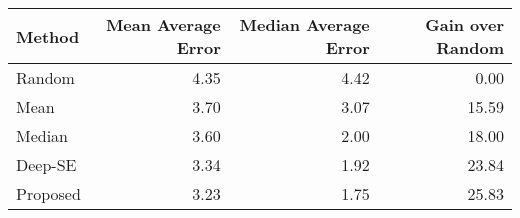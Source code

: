 \begin{tabular}{lrrr}
\toprule
   Method &  Mean Average Error &  Median Average Error &  Gain over Random \\
\midrule
   Random &                4.35 &                  4.42 &              0.00 \\
     Mean &                3.70 &                  3.07 &             15.59 \\
   Median &                3.60 &                  2.00 &             18.00 \\
  Deep-SE &                3.34 &                  1.92 &             23.84 \\
 Proposed &                3.23 &                  1.75 &             25.83 \\
\bottomrule
\end{tabular}
